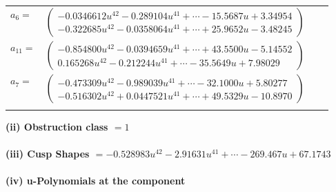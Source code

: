 \documentclass[1p]{elsarticle_modified}
\theoremstyle{definition}
\begin{document}
\begin{tabular}{m{7pt} m{180pt} m{7pt} m{180pt} }
\flushright $a_{6}=$&$\begin{pmatrix}-0.0346612 u^{42}-0.289104 u^{41}+\cdots-15.5687 u+3.34954\\-0.322685 u^{42}-0.0358064 u^{41}+\cdots+25.9652 u-3.48245\end{pmatrix}$ \\
\flushright $a_{11}=$&$\begin{pmatrix}-0.854800 u^{42}-0.0394659 u^{41}+\cdots+43.5500 u-5.14552\\0.165268 u^{42}-0.212244 u^{41}+\cdots-35.5649 u+7.98029\end{pmatrix}$ \\
\flushright $a_{7}=$&$\begin{pmatrix}-0.473309 u^{42}-0.989039 u^{41}+\cdots-32.1000 u+5.80277\\-0.516302 u^{42}+0.0447521 u^{41}+\cdots+49.5329 u-10.8970\end{pmatrix}$\\&\end{tabular}
\flushleft \textbf{(ii) Obstruction class $= 1$}\\~\\
\flushleft \textbf{(iii) Cusp Shapes $= -0.528983 u^{42}-2.91631 u^{41}+\cdots-269.467 u+67.1743$}\\~\\
\newpage\renewcommand{\arraystretch}{1}
\flushleft \textbf{(iv) u-Polynomials at the component}\newline \\
\end{document}
